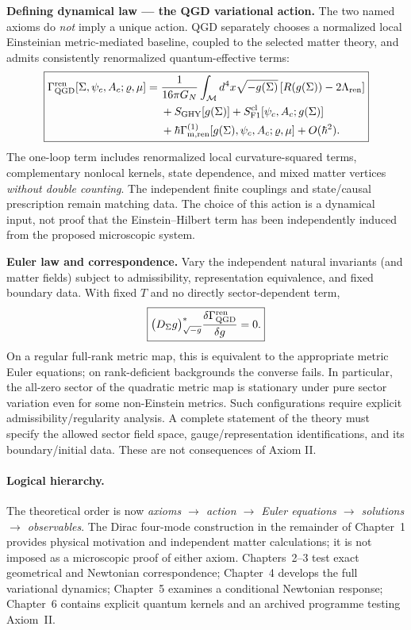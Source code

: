 \documentclass[11pt,a4paper]{article}
\begin{document}
\medskip\noindent\textbf{Defining dynamical law --- the QGD variational action.}
The two named axioms do \emph{not} imply a unique action. QGD separately chooses a normalized local Einsteinian metric-mediated baseline, coupled to the selected matter theory, and admits consistently renormalized quantum-effective terms:
\begin{equation}\label{eq:qgd-front-action-2026}
\boxed{\begin{aligned}
\Gamma_{\rm QGD}^{\rm ren}[\Sigma,\psi_c,A_c;\varrho,\mu]
={}&\frac1{16\pi G_N}\int_{\mathcal M}d^4x\sqrt{-g(\Sigma)}\,[R(g(\Sigma))-2\Lambda_{\rm ren}]\\
&+S_{\rm GHY}[g(\Sigma)]+S_{\rm F1}^{\rm cl}[\psi_c,A_c;g(\Sigma)]\\
&+\hbar\Gamma_{\rm m,ren}^{(1)}[g(\Sigma),\psi_c,A_c;\varrho,\mu]+O(\hbar^2).
\end{aligned}}
\end{equation}
The one-loop term includes renormalized local curvature-squared terms, complementary nonlocal kernels, state dependence, and mixed matter vertices \emph{without double counting}. The independent finite couplings and state/causal prescription remain matching data. The choice of this action is a dynamical input, not proof that the Einstein--Hilbert term has been independently induced from the proposed microscopic system.

\noindent\textbf{Euler law and correspondence.} Vary the independent natural invariants (and matter fields) subject to admissibility, representation equivalence, and fixed boundary data. With fixed $T$ and no directly sector-dependent term,
\begin{equation}\label{eq:qgd-front-pullback-2026}
\boxed{\bigl(D_\Sigma g\bigr)^*_{\sqrt{-g}}\frac{\delta\Gamma_{\rm QGD}^{\rm ren}}{\delta g}=0.}
\end{equation}
On a regular full-rank metric map, this is equivalent to the appropriate metric Euler equations; on rank-deficient backgrounds the converse fails. In particular, the all-zero sector of the quadratic metric map is stationary under pure sector variation even for some non-Einstein metrics. Such configurations require explicit admissibility/regularity analysis. A complete statement of the theory must specify the allowed sector field space, gauge/representation identifications, and its boundary/initial data. These are not consequences of Axiom II.


\paragraph{Logical hierarchy.} The theoretical order is now \emph{axioms $\to$ action $\to$ Euler equations $\to$ solutions $\to$ observables}. The Dirac four-mode construction in the remainder of Chapter~1 provides physical motivation and independent matter calculations; it is not imposed as a microscopic proof of either axiom. Chapters~2--3 test exact geometrical and Newtonian correspondence; Chapter~4 develops the full variational dynamics; Chapter~5 examines a conditional Newtonian response; Chapter~6 contains explicit quantum kernels and an archived programme testing Axiom~II.
\clearpage
\end{document}
